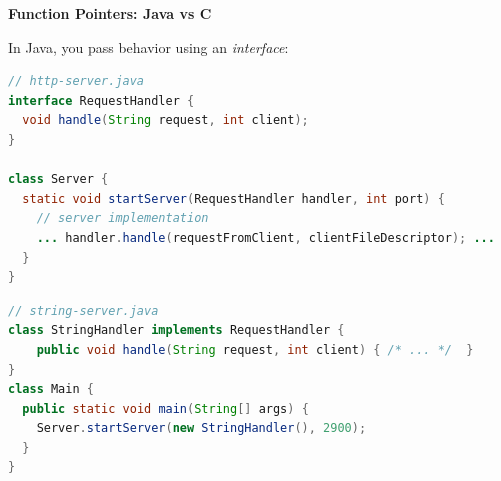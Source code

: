 \documentclass[oneside, landscape]{article}
\begin{document}
\begin{minipage}[t]{0.45\textwidth}

\textbf{Function Pointers: Java vs C}

\vspace{0.5em}

In Java, you pass behavior using an \textit{interface}:

\begin{lstlisting}[frame=single, language=Java, basicstyle=\ttfamily\footnotesize, numbers=none]
// http-server.java
interface RequestHandler {
  void handle(String request, int client);
}

class Server {
  static void startServer(RequestHandler handler, int port) {
    // server implementation
    ... handler.handle(requestFromClient, clientFileDescriptor); ...
  }
}
\end{lstlisting}

\begin{lstlisting}[frame=single, language=Java, basicstyle=\ttfamily\footnotesize, numbers=none]
// string-server.java
class StringHandler implements RequestHandler {
    public void handle(String request, int client) { /* ... */  }
}
class Main {
  public static void main(String[] args) {
    Server.startServer(new StringHandler(), 2900);
  }
}
\end{lstlisting}

\end{minipage}
\hfill
\end{document}
